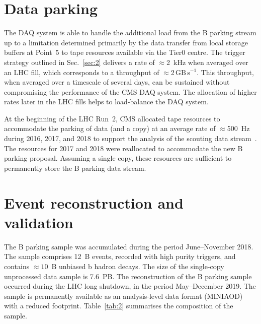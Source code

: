 \documentclass{webofc}
\newcommand{\gbs}{\ensuremath{\,\textrm{GB}\,\textrm{s}^{-1}}\xspace}
\begin{document}
\section{Data parking}
\label{sec:3}

The DAQ system is able to handle the additional load from the B
parking stream up to a limitation determined primarily by the data
transfer from local storage buffers at Point~5 to tape resources
available via the Tier0 centre. The trigger strategy outlined in
Sec.~\ref{sec:2} delivers a rate of ${\approx}$2~kHz when averaged
over an LHC fill, which corresponds to a throughput of
${\approx}$2\gbs. This throughput, when averaged over a timescale of
several days, can be sustained without compromising the performance of
the CMS DAQ system.
The allocation of higher rates later in the LHC fills helps to
load-balance the DAQ system.

At the beginning of the LHC Run~2, CMS allocated tape resources to
accommodate the parking of data (and a copy) at an average rate of
${\approx}$500~Hz during 2016, 2017, and 2018 to support the analysis
of the scouting data stream~\cite{parking-dps}. The resources for 2017
and 2018 were reallocated to accommodate the new B parking proposal.
Assuming a single copy, these resources are sufficient to permanently
store the B parking data stream.

\section{Event reconstruction and validation}
\label{sec:4}

The B parking sample was accumulated during the period June--November
2018. The sample comprises 12~B events, recorded with high purity
triggers, and contains ${\approx}10$~B unbiased b hadron decays. The
size of the single-copy unprocessed data sample is 7.6~PB. The
reconstruction of the B parking sample occurred during the LHC long
shutdown, in the period May--December 2019. The sample is permanently
available as an analysis-level data format (MINIAOD) with a reduced
footprint. Table~\ref{tab:2} summarises the composition of the sample. 
\end{document}
